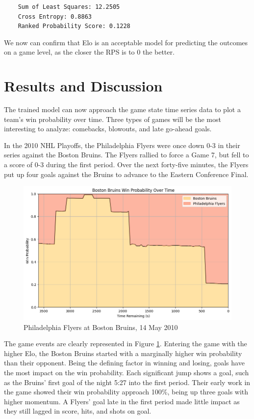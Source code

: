 \documentclass{article}
\begin{document}
  \begin{verbatim}
    Sum of Least Squares: 12.2505
    Cross Entropy: 0.8863
    Ranked Probability Score: 0.1228
  \end{verbatim}

We now can confirm that Elo is an acceptable model for predicting the outcomes on a game level, as the closer the RPS is to 0 the better.


\section{Results and Discussion}
The trained model can now approach the game state time series data to plot a team's win probability over time.
Three types of games will be the most interesting to analyze: comebacks, blowouts, and late go-ahead goals.

In the 2010 NHL Playoffs, the Philadelphia Flyers were once down 0-3 in their series against the Boston Bruins.
The Flyers rallied to force a Game 7, but fell to a score of 0-3 during the first period.
Over the next forty-five minutes, the Flyers put up four goals against the Bruins to advance to the Eastern Conference Final.

\begin{figure}
    \centering
    \includegraphics[width=1.0\linewidth]{2009030227.png}
    \caption{Philadelphia Flyers at Boston Bruins, 14 May 2010}
    \label{fig:comeback}
\end{figure}

The game events are clearly represented in Figure \ref{fig:comeback}.
Entering the game with the higher Elo, the Boston Bruins started with a marginally higher win probability than their opponent.
Being the defining factor in winning and losing, goals have the most impact on the win probability.
Each significant jump shows a goal, such as the Bruins' first goal of the night 5:27 into the first period.
Their early work in the game showed their win probability approach 100\%, being up three goals with higher momentum.
A Flyers' goal late in the first period made little impact as they still lagged in score, hits, and shots on goal.
\end{document}
